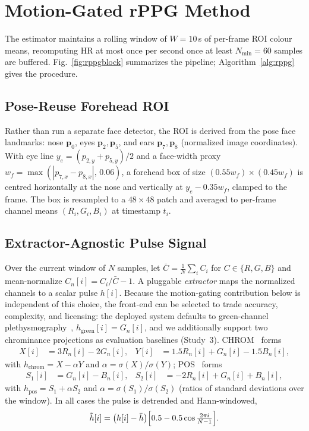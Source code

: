 \documentclass[journal,10pt]{IEEEtran}
\begin{document}
\section{Motion-Gated rPPG Method}\label{sec:rppg}
The estimator maintains a rolling window of $W=10$\,s of per-frame ROI colour
means, recomputing HR at most once per second once at least $N_{\min}=60$ samples
are buffered. Fig.~\ref{fig:rppgblock} summarizes the pipeline;
Algorithm~\ref{alg:rppg} gives the procedure.

\subsection{Pose-Reuse Forehead ROI}
Rather than run a separate face detector, the ROI is derived from the pose face
landmarks: nose $\mathbf{p}_0$, eyes $\mathbf{p}_2,\mathbf{p}_5$, and ears
$\mathbf{p}_7,\mathbf{p}_8$ (normalized image coordinates). With eye line
$y_e=(p_{2,y}+p_{5,y})/2$ and a face-width proxy
$w_f=\max(|p_{7,x}-p_{8,x}|,\,0.06)$, a forehead box of size
$(0.55w_f)\times(0.45w_f)$ is centred horizontally at the nose and vertically at
$y_e-0.35w_f$, clamped to the frame. The box is resampled to a $48\times48$ patch
and averaged to per-frame channel means $(R_i,G_i,B_i)$ at timestamp $t_i$.

\subsection{Extractor-Agnostic Pulse Signal}
Over the current window of $N$ samples, let $\bar C=\tfrac1N\sum_i C_i$ for
$C\in\{R,G,B\}$ and mean-normalize $C_n[i]=C_i/\bar C-1$. A pluggable
\emph{extractor} maps the normalized channels to a scalar pulse $h[i]$. Because
the motion-gating contribution below is independent of this choice, the front-end
can be selected to trade accuracy, complexity, and licensing: the deployed system
defaults to green-channel plethysmography~\cite{verkruysse2008},
$h_{\text{green}}[i]=G_n[i]$, and we additionally support two chrominance
projections as evaluation baselines (Study~3). CHROM~\cite{dehaan2013} forms
\begin{align}
X[i] &= 3R_n[i]-2G_n[i], & Y[i] &= 1.5R_n[i]+G_n[i]-1.5B_n[i],
\end{align}
with $h_{\text{chrom}}=X-\alpha Y$ and $\alpha=\sigma(X)/\sigma(Y)$; POS~\cite{wang2017} forms
\begin{align}
S_1[i] &= G_n[i]-B_n[i], & S_2[i] &= -2R_n[i]+G_n[i]+B_n[i],
\end{align}
with $h_{\text{pos}}=S_1+\alpha S_2$ and $\alpha=\sigma(S_1)/\sigma(S_2)$ (ratios of
standard deviations over the window). In all cases the pulse is detrended and
Hann-windowed,
\begin{equation}
\tilde h[i] = \bigl(h[i]-\bar h\bigr)\Bigl[0.5-0.5\cos\tfrac{2\pi i}{N-1}\Bigr].
\end{equation}
\end{document}
